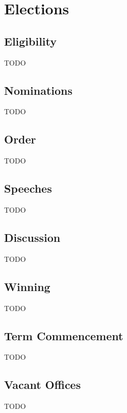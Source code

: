 \chapter{Elections}

\section{Eligibility}\label{sec:eligibility}
TODO

\section{Nominations}\label{sec:nominations}
TODO

\section{Order}\label{sec:order}
TODO

\section{Speeches}\label{sec:speeches}
TODO

\section{Discussion}\label{sec:discussion}
TODO

\section{Winning}\label{sec:winning}
TODO

\section{Term Commencement}\label{sec:term_commencement}
TODO

\section{Vacant Offices}\label{sec:vacant_offices}
TODO
